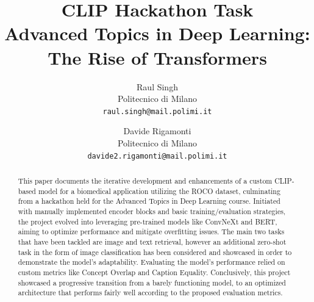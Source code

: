 \documentclass[10pt,twocolumn,letterpaper]{article}
\begin{document}
\title{CLIP Hackathon Task \\ \normalsize\bfseries Advanced Topics in Deep Learning: The Rise of Transformers}

\author{Raul Singh\\
Politecnico di Milano\\
{\tt\small raul.singh@mail.polimi.it}
\and
Davide Rigamonti\\
Politecnico di Milano\\
{\tt\small davide2.rigamonti@mail.polimi.it}
}

\maketitle

\begin{abstract}
This paper documents the iterative development and enhancements of a custom CLIP-based model for a biomedical application utilizing the ROCO dataset, culminating from a hackathon held for the Advanced Topics in Deep Learning course.
Initiated with manually implemented encoder blocks and basic training/evaluation strategies, the project evolved into leveraging pre-trained models like ConvNeXt and BERT, aiming to optimize performance and mitigate overfitting issues.
The main two tasks that have been tackled are image and text retrieval, however an additional zero-shot task in the form of image classification has been considered and showcased in order to demonstrate the model's adaptability.
Evaluating the model's performance relied on custom metrics like Concept Overlap and Caption Equality.
Conclusively, this project showcased a progressive transition from a barely functioning model, to an optimized architecture that performs fairly well according to the proposed evaluation metrics.
\end{abstract}
\end{document}
